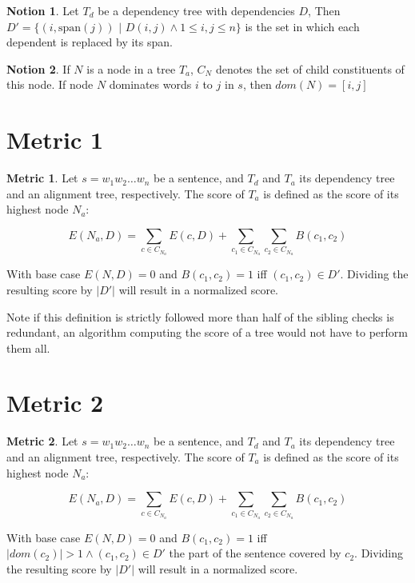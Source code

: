 \documentclass{report}
\theoremstyle{definition}
\newtheorem{metric}{Metric}
\newtheorem{notion}{Notion}
\theoremstyle{plain}
\begin{document}
\begin{notion}
Let $T_d$ be a dependency tree with dependencies $D$, Then $D' = \{ (i,\textrm{span}(j))$ $|$ $D(i,j) \land 1 \leq i,j \leq n \}$ is the set in which each dependent is replaced by its span.
\end{notion}

\begin{notion}
If $N$ is a node in a tree $T_a$, $C_N$ denotes the set of child constituents of this node. If node $N$ dominates words $i$ to $j$ in $s$, then $dom(N)= [i,j]$
\end{notion}

\section{Metric 1}

\begin{metric}\label{m1}
Let $s = w_1 w_2 \dots w_n$ be a sentence, and $T_d$ and $T_a$ its dependency tree and an alignment tree, respectively. The score of $T_a$ is defined as the score of its highest node $N_{a}$:

$$
E(N_a,D) = \sum_{c\in C_{N_a}} E(c,D)+ \sum_{c_1\in C_{N_a}} \sum_{c_2\in C_{N_a}} B(c_1,c_2)
$$

\noindent With base case $E(N,D) = 0$ and $B(c_1,c_2) = 1$ iff  $(c_1,c_2)\in D'$. Dividing the resulting score by $|D'|$ will result in a normalized score.
\end{metric}

\noindent  Note if this definition is strictly followed more than half of the sibling checks is redundant, an algorithm computing the score of a tree would not have to perform them all.

\section{Metric 2}

\begin{metric}\label{m2}
Let $s = w_1 w_2 \dots w_n$ be a sentence, and $T_d$ and $T_a$ its dependency tree and an alignment tree, respectively. The score of $T_a$ is defined as the score of its highest node $N_{a}$:

$$
E(N_a,D) = \sum_{c\in C_{N_a}} E(c,D)+ \sum_{c_1\in C_{N_a}} \sum_{c_2\in C_{N_a}} B(c_1,c_2)
$$

\noindent With base case $E(N,D) = 0$ and $B(c_1,c_2) = 1$ iff  $|dom(c_2)| > 1 \land (c_1,c_2)\in D'$ the part of the sentence covered by $c_2$. Dividing the resulting score by $|D'|$ will result in a normalized score.
\end{metric}
\end{document}
